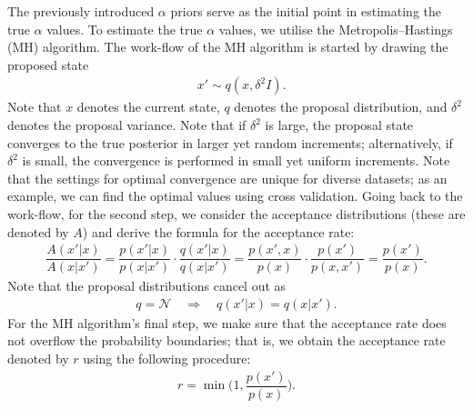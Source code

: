 \documentclass{mpaper}
\begin{document}
\par The previously introduced $\alpha$ priors serve as the initial point in estimating the true $\alpha$ values. To estimate the true $\alpha$ values, we utilise the Metropolis--Hastings (MH) algorithm. The work-flow of the MH algorithm is started by drawing the proposed state
\begin{align*}
&x' \sim q(x,\delta^2I).
\end{align*}
Note that $x$ denotes the current state, $q$ denotes the proposal distribution, and $\delta^2$ denotes the proposal variance. Note that if $\delta^2$ is large, the proposal state converges to the true posterior in larger yet random increments; alternatively, if $\delta^2$ is small, the convergence is performed in small yet uniform increments. Note that the settings for optimal convergence are unique for diverse datasets; as an example, we can find the optimal values using cross validation. Going back to the work-flow, for the second step, we consider the acceptance distributions (these are denoted by $A$) and derive the formula for the acceptance rate:
\begin{align*}
  \dfrac{A(x'|x)}{A(x|x')} = \dfrac{p(x'|x)}{p(x|x')}\cdot \dfrac{q(x'|x)}{q(x|x')} = \dfrac{p(x',x)}{p(x)}\cdot \dfrac{p(x')}{p(x,x')} = \dfrac{p(x')}{p(x)}.
\end{align*}
Note that the proposal distributions cancel out as
\begin{align*}
q = \mathcal{N} \quad \Longrightarrow \quad q(x'|x) = q(x|x').
\end{align*}
For the MH algorithm's final step, we make sure that the acceptance rate does not overflow the probability boundaries; that is, we obtain the acceptance rate denoted by $r$ using the following procedure:
\begin{align*}
  r = \min{\bigg(1, \dfrac{p(x')}{p(x)}\bigg)}.
\end{align*}
\end{document}
